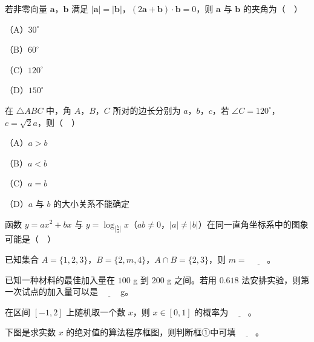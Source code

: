 \begin{question}
若非零向量 $\boldsymbol a$，$\boldsymbol b$ 满足 $|\boldsymbol a|=|\boldsymbol b|$，$(2\boldsymbol a+\boldsymbol b)\cdot\boldsymbol b=0$，则 $\boldsymbol a$ 与 $\boldsymbol b$ 的夹角为（　）

（A）$30^\circ$

（B）$60^\circ$

（C）$120^\circ$

（D）$150^\circ$

\end{question}
\begin{question}
在 $\triangle ABC$ 中，角 $A$，$B$，$C$ 所对的边长分别为 $a$，$b$，$c$，若 $\angle C=120^\circ$，$c=\sqrt2a$，则（　）

（A）$a>b$

（B）$a<b$

（C）$a=b$

（D）$a$ 与 $b$ 的大小关系不能确定

\Needspace{0.4\textheight}
\end{question}
\begingroup
\renewenvironment{question}{\Needspace{0.5\textheight}}{}
\begin{question}
函数 $y=ax^2+bx$ 与 $y=\log_{\left|\frac ba\right|}x$（$ab\neq0$，$|a|\neq|b|$）在同一直角坐标系中的图象可能是（　）
\nopagebreak[4]
\begin{center}\end{center}
\nopagebreak[4]
\end{question}
\endgroup
{}
\begin{question}
已知集合 $A=\{1,2,3\}$，$B=\{2,m,4\}$，$A\cap B=\{2,3\}$，则 $m=$ $\underline{\qquad}$。

\end{question}
\begin{question}
已知一种材料的最佳加入量在 $100$ g 到 $200$ g 之间。若用 $0.618$ 法安排实验，则第一次试点的加入量可以是 $\underline{\qquad}$ g。

\end{question}
\begin{question}
在区间 $[-1,2]$ 上随机取一个数 $x$，则 $x\in[0,1]$ 的概率为 $\underline{\qquad}$。

\Needspace{0.4\textheight}
\end{question}
\begingroup
\renewenvironment{question}{\Needspace{0.5\textheight}}{}
\begin{question}
下图是求实数 $x$ 的绝对值的算法程序框图，则判断框①中可填 $\underline{\qquad}$。
\nopagebreak[4]
\begin{center}\end{center}
\nopagebreak[4]
\Needspace{0.4\textheight}
\end{question}

